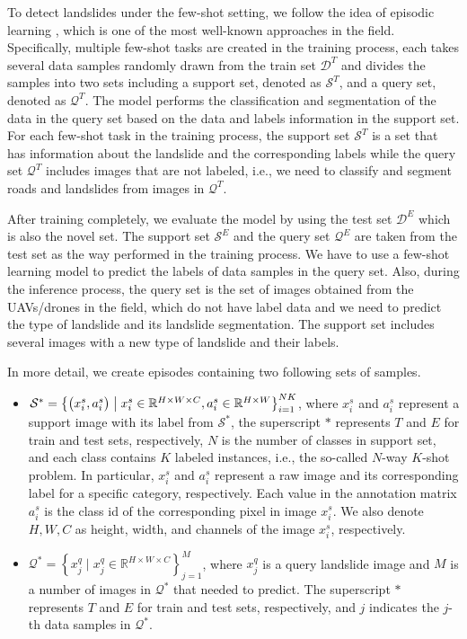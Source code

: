 \documentclass{ieeeaccess}
\begin{document}
To detect landslides under the few-shot setting, we follow the idea of episodic learning \cite{Li_2019_ICCV}, which is one of the most well-known approaches in the field. Specifically, multiple few-shot tasks are created in the training process, each takes several data samples randomly drawn from the train set $\mathcal{D}^T$ and divides the samples into two sets including a support set, denoted as $\mathcal{S}^T$, and a query set, denoted as $\mathcal{Q}^T$. 
The model performs the classification and segmentation of the data in the query set based on the data and labels information in the support set.
For each few-shot task in the training process, the support set $\mathcal{S}^T$ is a set that has information about the landslide and the corresponding labels while the query set $\mathcal{Q}^T$ includes images that are not labeled, i.e., we need to classify and segment roads and landslides from images in $\mathcal{Q}^T$. 

After training completely, we evaluate the model by using the test set $\mathcal{D}^E$ which is also the novel set. The support set $\mathcal{S}^E$ and the query set $\mathcal{Q}^E$ are taken from the test set as the way performed in the training process. We have to use a few-shot learning model to predict the labels of data samples in the query set. Also, during the inference process, the query set is the set of images obtained from the UAVs/drones in the field, which do not have label data and we need to predict the type of landslide and its landslide segmentation. The support set includes several images with a new type of landslide and their labels. 

In more detail, we create episodes containing two following sets of samples. 
\begin{itemize}
    \item $\mathcal{S}^{\ast}=\left\{\bigl(x^s_i, a^s_i\bigr) \bigm| x^s_i \in \mathbb{R}^{H \times W \times C}, a^s_i \in \mathbb{R}^{H \times W} \right\}_{i=1}^{N K}$, where $x^s_i$  and $a^s_i$ represent a support image with its label from $\mathcal{S}^{\ast}$, the superscript  $\ast$ represents $T$ and $E$ for train and test sets, respectively, $N$ is the number of classes in support set, and each class contains $K$ labeled instances, i.e., the so-called $N$-way $K$-shot problem. In particular, $x^s_i$ and $a^s_i$ represent a raw image and its corresponding label for a specific category, respectively. Each value in the annotation matrix $a^s_i$ is the class id of the corresponding pixel in image $x^s_i$. We also denote $H, W, C$ as height, width, and channels of the image $x^s_i$, respectively.
    \item $\mathcal{Q}^{\ast}=\left\{x^q_j \; | \; x^q_j \in \mathbb{R}^{H \times W \times C} \right\}_{j=1}^M$, where $x^q_j$ is a query landslide image and $M$ is a number of images in $\mathcal{Q}^{\ast}$ that needed to predict. The superscript  $\ast$ represents $T$ and $E$ for train and test sets, respectively, and $j$ indicates the $j$-th data samples in $\mathcal{Q}^{\ast}$. 
\end{itemize}
\end{document}
